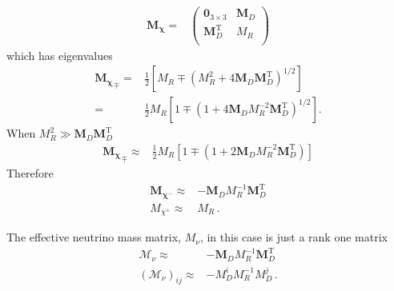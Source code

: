 \begin{align}
  \boldsymbol{M_{\chi}}=& \begin{pmatrix}
   \mathbf{0}_{3 \times 3} &            \boldsymbol{M}_D \\
   \boldsymbol{M}_D^{\operatorname{T}} & M_R \\
 \end{pmatrix}
\end{align}
which has eigenvalues
\begin{align}
{  \boldsymbol{M_{\chi}}}_\mp=&\frac{1}{2} \left[ M_R \mp \left( M_R^2 + 4   \boldsymbol{M}_D   \boldsymbol{M}_D^{\operatorname{T}}  \right)^{1/2} \right] \nonumber\\
  =&\frac{1}{2} M_R\left[ 1 \mp  \left( 1 + 4   \boldsymbol{M}_D M_R^{-2}   \boldsymbol{M}_D ^{\operatorname{T}}  \right)^{1/2} \right].
\end{align}
When $M_R^2 \gg \boldsymbol{M}_D  \boldsymbol{M}_D ^{\operatorname{T}} $
\begin{align}
  { \boldsymbol{M_{\chi}}}_\mp\approx &\frac{1}{2} M_R\left[ 1 \mp  \left( 1 +   2 \boldsymbol{M}_D M_R^{-2}   \boldsymbol{M}_D^{\operatorname{T}}  \right)
   \right]
\end{align}
Therefore
\begin{align}
 \boldsymbol{M_{\chi^-} }\approx&-   \boldsymbol{M}_D M_R^{-1}   \boldsymbol{M}_D^{\operatorname{T}}  \nonumber\\
 M_{\chi^+} \approx&    M_R\,.
\end{align}

The effective neutrino mass matrix, $M_{\nu}$,  in this case   is just a rank one matrix
\begin{align}
  \boldsymbol{\mathcal{M}}_{\nu}\approx&- \boldsymbol{M}_D M_R^{-1} \boldsymbol{M}_D^{\operatorname{T}}\nonumber\\
  \left( {\mathcal{M}}_{\nu} \right)_{ij}\approx&- M_D^i M_R^{-1} M_D^{j}\,.
\end{align}

